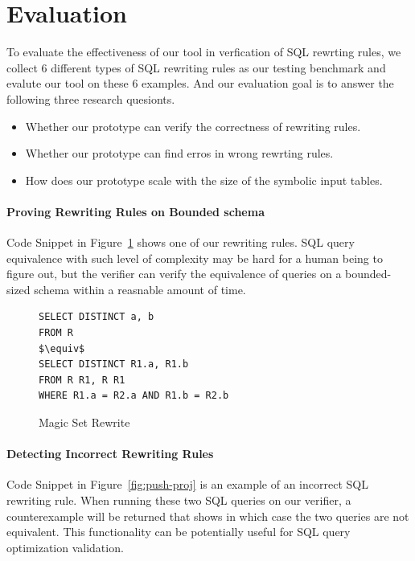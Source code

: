 \section{Evaluation}
\label{sec:eval}
To evaluate the effectiveness of our tool in verfication of SQL rewrting rules, we collect 6 different types of SQL rewriting rules as our testing benchmark and evalute our tool on these 6 examples. And our evaluation goal is to answer the following three research quesionts.
\begin{itemize}\itemsep0pt
\item Whether our prototype can verify the correctness of rewriting rules.
\item Whether our prototype can find erros in wrong rewrting rules.
\item How does our prototype scale with the size of the symbolic input tables.
\end{itemize}

\paragraph{Proving Rewriting Rules on Bounded schema}
Code Snippet in Figure~\ref{fig:magic} shows one of our rewriting rules. 
SQL query equivalence with such level of complexity may be hard for a human being to 
figure out, but the verifier can verify the equivalence of queries on a bounded-sized 
schema within a reasnable amount of time.

\begin{figure}[!htb]
\begin{lstlisting}[style=sql,xleftmargin=.3\textwidth,mathescape=true]
SELECT DISTINCT a, b
FROM R
$\equiv$
SELECT DISTINCT R1.a, R1.b
FROM R R1, R R1
WHERE R1.a = R2.a AND R1.b = R2.b
\end{lstlisting}
\caption{Magic Set Rewrite}
\label{fig:magic}
\end{figure}

\paragraph{Detecting Incorrect Rewriting Rules}
Code Snippet in Figure~\ref{fig:push-proj} is an example 
of an incorrect SQL rewriting rule.
When running these two SQL queries on our verifier, a counterexample will be returned that
shows in which case the two queries are not equivalent.
This functionality can be potentially useful for SQL query optimization validation.

